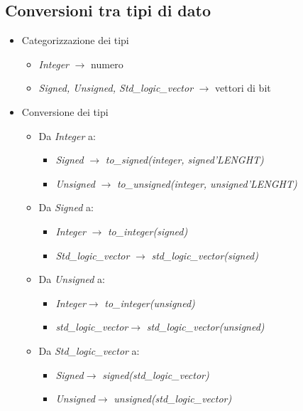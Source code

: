 \documentclass{article}
\begin{document}
\subsection{Conversioni tra tipi di dato}
\begin{itemize}
	\item Categorizzazione dei tipi
	\begin{itemize}
		\item \textit{Integer} \(\rightarrow\) numero
		\item \textit{Signed, Unsigned, Std\_logic\_vector} \(\rightarrow\) vettori di bit
	\end{itemize}
	\item Conversione dei tipi
	\begin{itemize}
	\item Da \textit{Integer} a:
	\begin{itemize}
		\item \textit{Signed} \(\rightarrow\) \textit{to\_signed(integer, signed'LENGHT)}
		\item \textit{Unsigned} \(\rightarrow\) \textit{to\_unsigned(integer, unsigned'LENGHT)}
	\end{itemize}
	\item Da \textit{Signed} a:
	\begin{itemize}
		\item \textit{Integer} \(\rightarrow\) \textit{to\_integer(signed)}
		\item \textit{Std\_logic\_vector} \(\rightarrow\) \textit{std\_logic\_vector(signed)}
	\end{itemize}
	\item Da \textit{Unsigned} a:
	\begin{itemize}
		\item \textit{Integer}\(\rightarrow\) \textit{to\_integer(unsigned)}
		\item \textit{std\_logic\_vector}\(\rightarrow\) \textit{std\_logic\_vector(unsigned)}
	\end{itemize}
	\item Da \textit{Std\_logic\_vector} a:
	\begin{itemize}
		\item \textit{Signed}\(\rightarrow\) \textit{signed(std\_logic\_vector)}
		\item \textit{Unsigned}\(\rightarrow\) \textit{unsigned(std\_logic\_vector)}
	\end{itemize}
\end{itemize}
	\end{itemize}
\newpage
\end{document}
